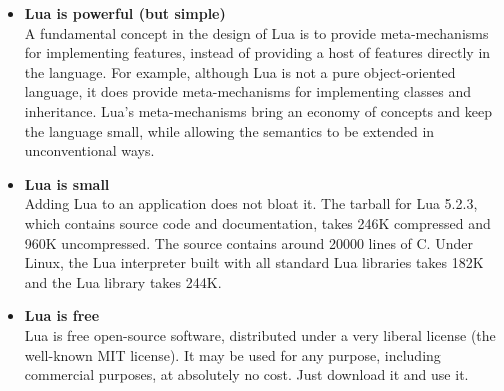 \begin{itemize}
\item \textbf{Lua is powerful (but simple)}\\
 A fundamental concept in the design of Lua is to provide meta-mechanisms for implementing features, instead of providing a host of features directly in the language. For example, although Lua is not a pure object-oriented language, it does provide meta-mechanisms for implementing classes and inheritance. Lua's meta-mechanisms bring an economy of concepts and keep the language small, while allowing the semantics to be extended in unconventional ways.
\item \textbf{Lua is small}\\
 Adding Lua to an application does not bloat it. The tarball for Lua 5.2.3, which contains source code and documentation, takes 246K compressed and 960K uncompressed. The source contains around 20000 lines of C. Under Linux, the Lua interpreter built with all standard Lua libraries takes 182K and the Lua library takes 244K. 
\item \textbf{Lua is free}\\
 Lua is free open-source software, distributed under a very liberal license (the well-known MIT license). It may be used for any purpose, including commercial purposes, at absolutely no cost. Just download it and use it. 
\end{itemize}
